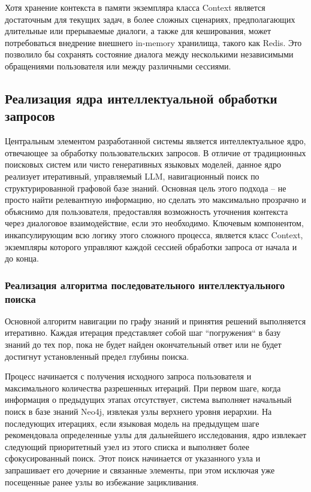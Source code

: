 Хотя хранение контекста в памяти экземпляра класса Context является достаточным для текущих задач, в более сложных сценариях, предполагающих длительные или прерываемые диалоги, а также для кеширования, может потребоваться внедрение внешнего in-memory хранилища, такого как Redis\cite{Redis}. Это позволило бы сохранять состояние диалога между несколькими независимыми обращениями пользователя или между различными сессиями.

\subsection{Реализация ядра интеллектуальной обработки запросов}

Центральным элементом разработанной системы является интеллектуальное ядро, отвечающее за обработку пользовательских запросов. В отличие от традиционных поисковых систем или чисто генеративных языковых моделей, данное ядро реализует итеративный, управляемый LLM, навигационный поиск по структурированной графовой базе знаний. Основная цель этого подхода – не просто найти релевантную информацию, но сделать это максимально прозрачно и объяснимо для пользователя, предоставляя возможность уточнения контекста через диалоговое взаимодействие, если это необходимо. Ключевым компонентом, инкапсулирующим всю логику этого сложного процесса, является класс Context, экземпляры которого управляют каждой сессией обработки запроса от начала и до конца.

\subsubsection{Реализация алгоритма последовательного интеллектуального поиска}

Основной алгоритм навигации по графу знаний и принятия решений выполняется итеративно. Каждая итерация представляет собой шаг ``погружения`` в базу знаний до тех пор, пока не будет найден окончательный ответ или не будет достигнут установленный предел глубины поиска.

Процесс начинается с получения исходного запроса пользователя и максимального количества разрешенных итераций. При первом шаге, когда информация о предыдущих этапах отсутствует, система выполняет начальный поиск в базе знаний Neo4j, извлекая узлы верхнего уровня иерархии. На последующих итерациях, если языковая модель на предыдущем шаге рекомендовала определенные узлы для дальнейшего исследования, ядро извлекает следующий приоритетный узел из этого списка и выполняет более сфокусированный поиск. Этот поиск начинается от указанного узла и запрашивает его дочерние и связанные элементы, при этом исключая уже посещенные ранее узлы во избежание зацикливания.

